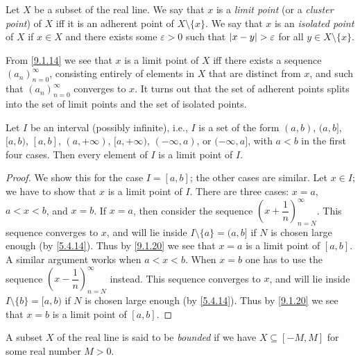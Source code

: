 \begin{defn}\label{9.1.18}
  Let \(X\) be a subset of the real line.
  We say that \(x\) is a \emph{limit point} (or a \emph{cluster point}) of \(X\) iff it is an adherent point of \(X \setminus \{x\}\).
  We say that \(x\) is an \emph{isolated point} of \(X\) if \(x \in X\) and there exists some \(\varepsilon > 0\) such that \(\left\lvert x - y\right\rvert > \varepsilon\) for all \(y \in X \setminus \{x\}\).
\end{defn}

\setcounter{thm}{19}
\begin{rmk}\label{9.1.20}
  From \cref{9.1.14} we see that \(x\) is a limit point of \(X\) iff there exists a sequence \((a_n)_{n = 0}^\infty\), consisting entirely of elements in \(X\) that are distinct from \(x\), and such that \((a_n)_{n = 0}^\infty\) converges to \(x\).
  It turns out that the set of adherent points splits into the set of limit points and the set of isolated points.
\end{rmk}

\begin{lem}\label{9.1.21}
  Let \(I\) be an interval (possibly infinite), i.e., \(I\) is a set of the form \((a, b)\), \((a, b]\), \([a, b)\), \([a, b]\), \((a, +\infty)\), \([a, +\infty)\), \((-\infty, a)\), or \((-\infty, a]\), with \(a < b\) in the first four cases.
  Then every element of \(I\) is a limit point of \(I\).
\end{lem}

\begin{proof}
  We show this for the case \(I = [a, b]\);
  the other cases are similar.
  Let \(x \in I\);
  we have to show that \(x\) is a limit point of \(I\).
  There are three cases: \(x = a\), \(a < x < b\), and \(x = b\).
  If \(x = a\), then consider the sequence \((x + \dfrac{1}{n})_{n = N}^\infty\).
  This sequence converges to \(x\), and will lie inside \(I \setminus \{a\} = (a, b]\) if \(N\) is chosen large enough (by \cref{5.4.14}).
  Thus by \cref{9.1.20} we see that \(x = a\) is a limit point of \([a, b]\).
  A similar argument works when \(a < x < b\).
  When \(x = b\) one has to use the sequence \((x - \dfrac{1}{n})_{n = N}^\infty\) instead.
  This sequence converges to \(x\), and will lie inside \(I \setminus \{b\} = [a, b)\) if \(N\) is chosen large enough (by \cref{5.4.14}).
  Thus by \cref{9.1.20} we see that \(x = b\) is a limit point of \([a, b]\).
\end{proof}

\begin{defn}\label{9.1.22}
  A subset \(X\) of the real line is said to be \emph{bounded} if we have \(X \subseteq [-M, M]\) for some real number \(M > 0\).
\end{defn}

